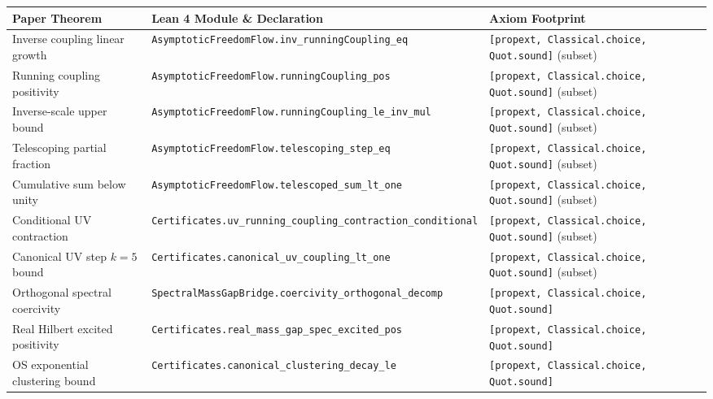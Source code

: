 \documentclass[11pt,a4paper]{article}
\begin{document}
\begin{table}[ht]
\centering
\scriptsize
\begin{tabular}{@{}p{4.3cm}p{6.6cm}p{3.4cm}@{}}
\toprule
Paper Theorem & Lean 4 Module \& Declaration & Axiom Footprint \\
\midrule
Inverse coupling linear growth & \texttt{AsymptoticFreedomFlow.}\newline\texttt{inv\_runningCoupling\_eq} & \texttt{[propext, Classical.choice,} \texttt{Quot.sound]} (subset) \\
Running coupling positivity & \texttt{AsymptoticFreedomFlow.}\newline\texttt{runningCoupling\_pos} & \texttt{[propext, Classical.choice,} \texttt{Quot.sound]} (subset) \\
Inverse-scale upper bound & \texttt{AsymptoticFreedomFlow.}\newline\texttt{runningCoupling\_le\_inv\_mul} & \texttt{[propext, Classical.choice,} \texttt{Quot.sound]} (subset) \\
Telescoping partial fraction & \texttt{AsymptoticFreedomFlow.}\newline\texttt{telescoping\_step\_eq} & \texttt{[propext, Classical.choice,} \texttt{Quot.sound]} (subset) \\
Cumulative sum below unity & \texttt{AsymptoticFreedomFlow.}\newline\texttt{telescoped\_sum\_lt\_one} & \texttt{[propext, Classical.choice,} \texttt{Quot.sound]} (subset) \\
Conditional UV contraction & \texttt{Certificates.}\newline\texttt{uv\_running\_coupling\_contraction\_conditional} & \texttt{[propext, Classical.choice,} \texttt{Quot.sound]} (subset) \\
Canonical UV step $k=5$ bound & \texttt{Certificates.}\newline\texttt{canonical\_uv\_coupling\_lt\_one} & \texttt{[propext, Classical.choice,} \texttt{Quot.sound]} (subset) \\
Orthogonal spectral coercivity & \texttt{SpectralMassGapBridge.}\newline\texttt{coercivity\_orthogonal\_decomp} & \texttt{[propext, Classical.choice,} \texttt{Quot.sound]} \\
Real Hilbert excited positivity & \texttt{Certificates.}\newline\texttt{real\_mass\_gap\_spec\_excited\_pos} & \texttt{[propext, Classical.choice,} \texttt{Quot.sound]} \\
OS exponential clustering bound & \texttt{Certificates.}\newline\texttt{canonical\_clustering\_decay\_le} & \texttt{[propext, Classical.choice,} \texttt{Quot.sound]} \\

\end{tabular}
\end{table}
\end{document}
